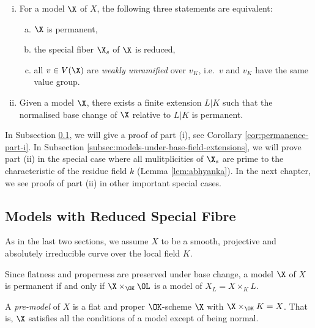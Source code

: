 \begin{theorem} \label{thm:permanence}
    \begin{enumerate}[(i)]
        \item For a model $\X$ of $X$,  the following three statements are equivalent:
            \begin{enumerate}[(a)]
                \item $\X$ is permanent,
                \item the special fiber $\X_s$ of $\X$ is reduced,
                \item all $v\in V(\X)$ are \emph{weakly unramified} over $v_K$, i.e.\ $v$ and $v_K$ have the same value group.
            \end{enumerate}
        \item Given a model $\X$, there exists a finite extension $L|K$ such that the normalised base change of $\X$ relative to $L|K$ is permanent.
    \end{enumerate}
\end{theorem}

In Subsection \ref{subsec:models-with-reduced-special-fibre}, we will give a proof of part (i), see Corollary \ref{cor:permanence-part-i}.
In Subsection \ref{subsec:models-under-base-field-extensions}, we will prove part (ii) in the special case where all mulitplicities of $\X_s$
are prime to the characteristic of the residue field $k$ (Lemma \ref{lem:abhyanka}).
In the next chapter, we see proofs of part (ii) in other important special cases.

\subsection{Models with Reduced Special Fibre}\label{subsec:models-with-reduced-special-fibre}

As in the last two sections, we assume $X$ to be a smooth, projective and absolutely irreducible curve over the local
field $K$.


\begin{remark}
    Since flatness and properness are preserved under base change, a model $\X$ of $X$ is permanent if and only if
    $\X \times_{\OK} \OL$ is a model of $X_L = X \times_K L$.
\end{remark}

\begin{definition}
    A \textit{pre-model} of $X$ is a flat and proper $\OK$-scheme $\X$ with $\X \times_{\OK} K = X$.
    That is, $\X$ satisfies all the conditions of a model except of being normal.
\end{definition}

